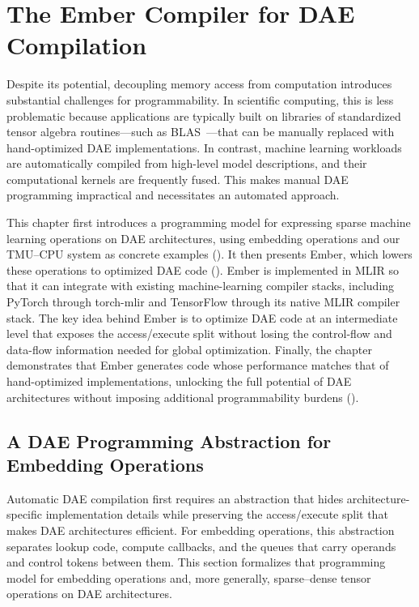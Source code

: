 \chapter{The Ember Compiler for DAE Compilation} \label{sec:dae-compilation} %

Despite its potential, decoupling memory access from computation introduces substantial challenges for programmability. In scientific computing, this is less problematic because applications are typically built on libraries of standardized tensor algebra routines---such as BLAS~\cite{lawson1979basic}---that can be manually replaced with hand-optimized DAE implementations. In contrast, machine learning workloads are automatically compiled from high-level model descriptions, and their computational kernels are frequently fused. This makes manual DAE programming impractical and necessitates an automated approach.

This chapter first introduces a programming model for expressing sparse machine learning operations on DAE architectures, using embedding operations and our TMU--CPU system as concrete examples (). It then presents Ember, which lowers these operations to optimized DAE code (). Ember is implemented in MLIR so that it can integrate with existing machine-learning compiler stacks, including PyTorch through torch-mlir and TensorFlow through its native MLIR compiler stack. The key idea behind Ember is to optimize DAE code at an intermediate level that exposes the access/execute split without losing the control-flow and data-flow information needed for global optimization. Finally, the chapter demonstrates that Ember generates code whose performance matches that of hand-optimized implementations, unlocking the full potential of DAE architectures without imposing additional programmability burdens ().

\section{A DAE Programming Abstraction for Embedding Operations} \label{sec:dae-programming-abstraction} %

Automatic DAE compilation first requires an abstraction that hides architecture-specific implementation details while preserving the access/execute split that makes DAE architectures efficient. For embedding operations, this abstraction separates lookup code, compute callbacks, and the queues that carry operands and control tokens between them. This section formalizes that programming model for embedding operations and, more generally, sparse--dense tensor operations on DAE architectures.


